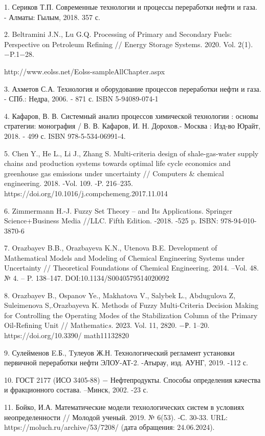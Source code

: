 \begin{noparindent}
1. Сериков Т.П. Современные технологии и процессы переработки нефти и
газа. - Алматы: Гылым, 2018. 357 с.

2. Beltramini J.N., Lu G.Q. Processing of Primary and Secondary Fuels:
Perspective on Petroleum Refining // Energy Storage Systems. 2020. Vol.
2(1). −P.1−28.

http://www.eolss.net/Eolss-sampleAllChapter.aspx

3. Ахметов С.А. Технология и оборудование процессов переработки нефти и
газа. - СПб.: Недра, 2006. - 871 с. ISBN 5-94089-074-1

4. Кафаров, В. В. Системный анализ процессов химической технологии :
основы стратегии: монография / В. В. Кафаров, И. Н. Дорохов.- Москва :
Изд-во Юрайт, 2018. - 499 с. ISBN 978-5-534-06991-4.

5. Chen Y., He L., Li J., Zhang S. Multi-criteria design of
shale-gas-water supply chains and production systems towards optimal
life cycle economics and greenhouse gas emissions under uncertainty //
Computers \& chemical engineering. 2018. -Vol. 109. -P. 216--235.
https://doi.org/10.1016/j.compchemeng.2017.11.014

6. Zimmermann H.-J. Fuzzy Set Theory -- and Its Applications. Springer
Science+Business Media //LLC. Fifth Edition. -2018. -525 p. ISBN:
978-94-010-3870-6

7. Orazbayev B.B., Orazbayeva K.N., Utenova B.E. Development of
Mathematical Models and Modeling of Chemical Engineering Systems under
Uncertainty // Theoretical Foundations of Chemical Engineering. 2014.
--Vol. 48. № 4. -- P. 138--147. DOI:10.1134/S0040579514020092

8. Orazbayev B., Ospanov Ye., Makhatova V., Salybek L., Abdugulova Z,
Suleimenova S,.Orazbayeva K. Methods of Fuzzy Multi-Criteria Decision
Making for Controlling the Operating Modes of the Stabilization Column
of the Primary Oil-Refining Unit // Mathematic\emph{s.} 2023. Vol. 11,
2820. −Р. 1--20. \\https://doi.org/10.3390/ math11132820

9. Сулейменов E.Б., Tулеуов Ж.Н. Технологический регламент установки
первичной переработки нефти ЭЛОУ-АТ-2. -Атырау, изд. АУНГ, 2019. -112 с.

10. ГОСТ 2177 (ИСО 3405-88) − Нефтепродукты. Способы определения
качества и фракционного состава. --Минск, 2002. -23 с.

11. Бойко, И.А. Математические модели технологических систем в условиях
неопределенности // Молодой ученый. 2019. № 6(53). -С. 30-33. URL:
https://moluch.ru/archive/53/7208/ (дата обращения: 24.06.2024).


\end{noparindent}
